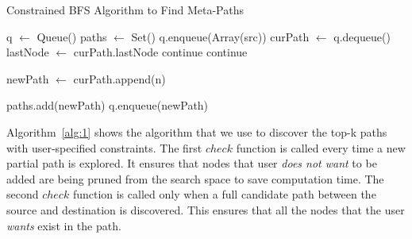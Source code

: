 \begin{algorithm}
    \caption{Constrained BFS Algorithm to Find Meta-Paths}
    \label{alg:1}
    \begin{algorithmic}[1]
            \State q $\gets$ Queue()
            \State paths $\gets$ Set()
            \State q.enqueue(Array(src))
            \State
                \State curPath $\gets$ q.dequeue()
                \State lastNode $\gets$ curPath.lastNode
                        \State continue
                        \State continue
                    \EndIf
                    \State

                    \State newPath $\gets$ curPath.append(n)

                            \State paths.add(newPath)
                        \EndIf
                    \Else
                        \State q.enqueue(newPath)
                    \EndIf
                \EndFor
            \EndWhile
            \State
            \State {}
        \EndFunction
    \end{algorithmic}
\end{algorithm}

Algorithm~\ref{alg:1} shows the algorithm that we use to discover the top-k
paths with user-specified constraints. The first $check$ function
is called every time a new partial path is explored. It ensures that nodes
that user \textit{does not want} to be added are being pruned from the search
space to save computation time. The second $check$ function
is called only when a full candidate path between the source and destination
is discovered. This ensures that all the nodes that the user \textit{wants}
exist in the path.
